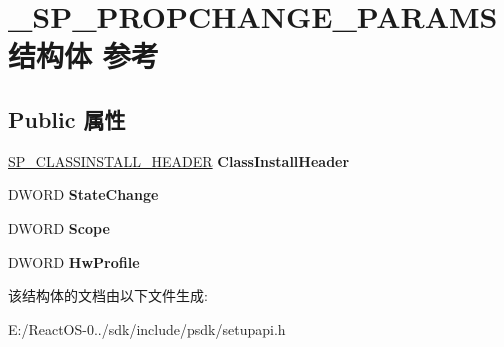 \hypertarget{struct___s_p___p_r_o_p_c_h_a_n_g_e___p_a_r_a_m_s}{}\section{\+\_\+\+S\+P\+\_\+\+P\+R\+O\+P\+C\+H\+A\+N\+G\+E\+\_\+\+P\+A\+R\+A\+M\+S结构体 参考}
\label{struct___s_p___p_r_o_p_c_h_a_n_g_e___p_a_r_a_m_s}
\subsection*{Public 属性}
\begin{DoxyCompactItemize}
\item 
\mbox{\label{struct___s_p___p_r_o_p_c_h_a_n_g_e___p_a_r_a_m_s_a7caa93a5d8221700cae5bdeb350e8bc1}} 
\hyperlink{struct___s_p___c_l_a_s_s_i_n_s_t_a_l_l___h_e_a_d_e_r}{S\+P\+\_\+\+C\+L\+A\+S\+S\+I\+N\+S\+T\+A\+L\+L\+\_\+\+H\+E\+A\+D\+ER} {\bfseries Class\+Install\+Header}
\item 
\mbox{\label{struct___s_p___p_r_o_p_c_h_a_n_g_e___p_a_r_a_m_s_ab3b613e298e4607c90099de6b818862f}} 
D\+W\+O\+RD {\bfseries State\+Change}
\item 
\mbox{\label{struct___s_p___p_r_o_p_c_h_a_n_g_e___p_a_r_a_m_s_ab6fd7a43e2006044ab6fbab6bc78d2a4}} 
D\+W\+O\+RD {\bfseries Scope}
\item 
\mbox{\label{struct___s_p___p_r_o_p_c_h_a_n_g_e___p_a_r_a_m_s_aff32f6b67a58e55dac40027fd567186f}} 
D\+W\+O\+RD {\bfseries Hw\+Profile}
\end{DoxyCompactItemize}


该结构体的文档由以下文件生成\+:\begin{DoxyCompactItemize}
\item 
E\+:/\+React\+O\+S-\/0../sdk/include/psdk/setupapi.\+h\end{DoxyCompactItemize}
